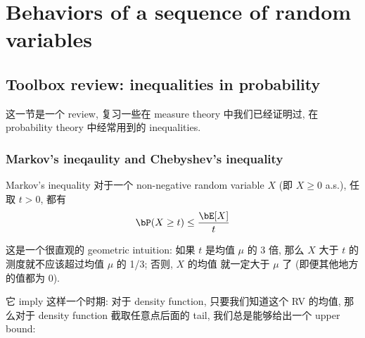\chapter{Behaviors of a sequence of random variables}
\section{Toolbox review: inequalities in probability}
这一节是一个 review,
复习一些在 measure theory 中我们已经证明过,
在 probability theory 中经常用到的 inequalities.
\subsection{Markov's ineqaulity and Chebyshev's inequality}
\begin{theorem}{Markov's inequality}
对于一个 non-negative random variable \(X\) (即 \(X \geq 0\) a.s.), 
任取 \(t > 0\), 都有
\[
\bP(X \geq t) \leq \frac{\bE[X]}{t}
\]  
\end{theorem}
\begin{remark}
这是一个很直观的 geometric intuition:
如果 $t$ 是均值 $\mu$ 的 3 倍, 那么 $X$ 大于 $t$ 
的测度就不应该超过均值 $\mu$ 的 1/3; 否则, $X$ 的均值
就一定大于 $\mu$ 了 (即便其他地方的值都为 0).

它 imply 这样一个时期: 对于 density function, 只要我们知道这个 RV 的均值,
那么对于 density function 截取任意点后面的 tail, 我们总是能够给出一个 upper bound:

\begin{center}
\end{center}


\end{remark}
